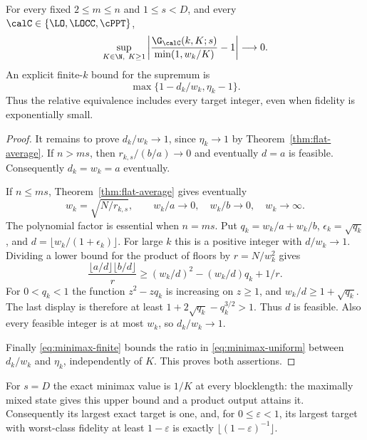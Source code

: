 \begin{theorem}\label{thm:minimax}
For every fixed $2\le m\le n$ and $1\le s<D$, and every $\calC\in\{\LO,\LOCC,\cPPT\}$,
\begin{equation}\label{eq:minimax-uniform}
 \sup_{K\in\N,\ K\ge1}
 \left|\frac{\G_{\calC}(k,K;s)}{\min(1,w_k/K)}-1\right|\longrightarrow0.
\end{equation}
An explicit finite-$k$ bound for the supremum is
\begin{equation}\label{eq:minimax-relative-bound}
 \max\{1-d_k/w_k,\eta_k-1\}.
\end{equation}
Thus the relative equivalence includes every target integer, even when fidelity is exponentially small.
\end{theorem}
\begin{proof}
It remains to prove $d_k/w_k\to1$, since $\eta_k\to1$ by Theorem~\ref{thm:flat-average}. If $n>ms$, then
$r_{k,s}/(b/a)\to0$ and eventually $d=a$ is feasible. Consequently $d_k=w_k=a$ eventually.

If $n\le ms$, Theorem~\ref{thm:flat-average} gives eventually
\[
 w_k=\sqrt{N/r_{k,s}},\qquad
 w_k/a\to0,\quad w_k/b\to0,\quad w_k\to\infty.
\]
The polynomial factor is essential when $n=ms$. Put $q_k=w_k/a+w_k/b$, $\epsilon_k=\sqrt{q_k}$, and $d=\lfloor w_k/(1+\epsilon_k)\rfloor$. For large $k$ this is a positive integer with $d/w_k\to1$. Dividing a lower bound for the product of floors by $r=N/w_k^2$ gives
\[
 \frac{\lfloor a/d\rfloor\lfloor b/d\rfloor}{r}
 \ge (w_k/d)^2-(w_k/d)q_k+1/r.
\]
For $0<q_k<1$ the function $z^2-zq_k$ is increasing on $z\ge1$, and $w_k/d\ge1+\sqrt{q_k}$. The last display is therefore at least
$1+2\sqrt{q_k}-q_k^{3/2}>1$. Thus $d$ is feasible. Also every feasible integer is at most $w_k$, so $d_k/w_k\to1$.

Finally \eqref{eq:minimax-finite} bounds the ratio in \eqref{eq:minimax-uniform} between $d_k/w_k$ and $\eta_k$, independently of $K$. This proves both assertions.
\end{proof}

For $s=D$ the exact minimax value is $1/K$ at every blocklength: the maximally mixed state gives this upper bound and a product output attains it. Consequently its largest exact target is one, and, for $0\le\varepsilon<1$, its largest target with worst-class fidelity at least $1-\varepsilon$ is exactly $\lfloor(1-\varepsilon)^{-1}\rfloor$.

